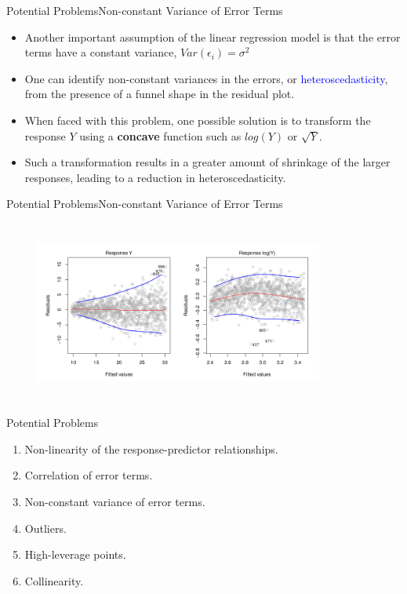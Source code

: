 \begin{frame}{Potential Problems}{Non-constant Variance of Error Terms}

\begin{itemize}
    \item Another important assumption of the linear regression model is that the error terms have a constant variance, $Var(\epsilon_i ) = \sigma^2$ \pause

    \item One can identify non-constant variances in the errors, or \textcolor{blue}{heteroscedasticity}, from the presence of a funnel shape in the residual plot. \pause

    \item When faced with this problem, one possible solution is to transform the response $Y$ using a \textbf{concave} function  such as $log(Y)$ or $\sqrt{Y}$. \pause

    \item Such a transformation results in a greater amount of shrinkage of the larger responses, leading to a reduction in heteroscedasticity. \pause

\end{itemize}
    
\end{frame}

\begin{frame}{Potential Problems}{Non-constant Variance of Error Terms}

    \begin{figure}[!h]
    \centering
    \includegraphics[height=6cm, width=9.5cm]{other-lr/heteroscedasticity.png}
    \end{figure} 
    
\end{frame}


\begin{frame}[noframenumbering]{Potential Problems}


\begin{enumerate}
    \item<1> Non-linearity of the response-predictor relationships.
    \item<1> Correlation of error terms.
    \item<1> Non-constant variance of error terms.
    \item<1-2> Outliers.
    \item<1> High-leverage points.
    \item<1> Collinearity.
\end{enumerate}
    
\end{frame}

